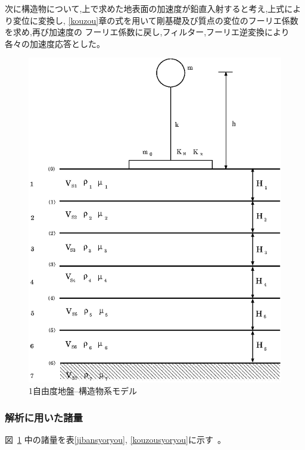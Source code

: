 \documentclass[titlepage]{jsarticle}
\begin{document}
次に構造物について,上で求めた地表面の加速度が鉛直入射すると考え,上式により変位に変換し,
\ref{kouzou}章の式を用いて剛基礎及び質点の変位のフーリエ係数を求め,再び加速度の
フーリエ係数に戻し,フィルター,フーリエ逆変換により各々の加速度応答とした。

\begin{figure}[htbp]
\begin{center}
\includegraphics[scale=1.0]{sdofkei.eps}
\caption{1自由度地盤--構造物系モデル}
\label{jiban-kouzoubutsu}
\end{center}
\end{figure}

\subsubsection{解析に用いた諸量}\label{syoryo}

図~\ref{jiban-kouzoubutsu} 中の諸量を表\ref{jibansyoryou},
\ref{kouzousyoryou}に示す~\cite{2gou,osaka,doshitsu}。
\end{document}
